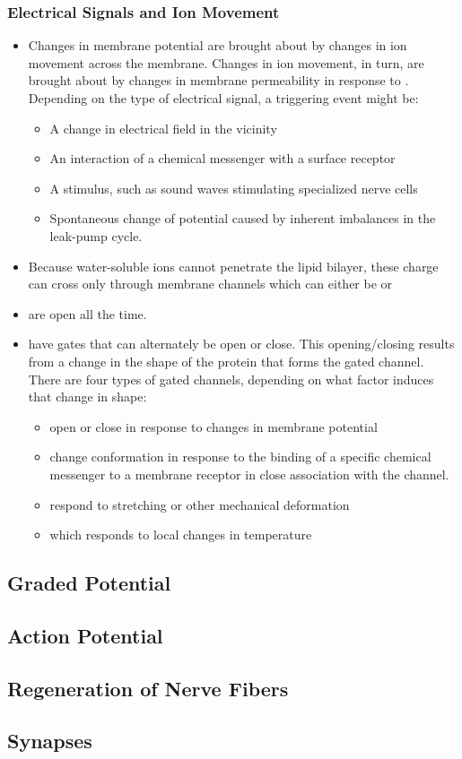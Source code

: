 \documentclass{article}
\numberwithin{equation}{section}
\begin{document}
\subsubsection{Electrical Signals and Ion Movement}
\begin{itemize}
    \item Changes in membrane potential are brought about by changes in ion movement across the membrane. Changes in ion movement, in turn, are brought about by changes in membrane permeability in response to . Depending on the type of electrical signal, a triggering event might be:
    \begin{itemize}
        \item A change in electrical field in the vicinity
        \item An interaction of a chemical messenger with a surface receptor
        \item A stimulus, such as sound waves stimulating specialized nerve cells
        \item Spontaneous change of potential caused by inherent imbalances in the leak-pump cycle.
    \end{itemize}
    \item Because water-soluble ions cannot penetrate the lipid bilayer, these charge can cross only through membrane channels which can either be  or 
    \item {} are open all the time.
    \item {} have gates that can alternately be open or close. This opening/closing results from a change in the shape of the protein that forms the gated channel. There are four types of gated channels, depending on what factor induces that change in shape:
    \begin{itemize}
        \item {} open or close in response to changes in membrane potential
        \item {} change conformation in response to the binding of a specific chemical messenger to a membrane receptor in close association with the channel.
        \item {} respond to stretching or other mechanical deformation
        \item {} which responds to local changes in temperature
    \end{itemize}
\end{itemize}
\subsection{Graded Potential}
\subsection{Action Potential}
\subsection{Regeneration of Nerve Fibers}
\subsection{Synapses}
\end{document}
